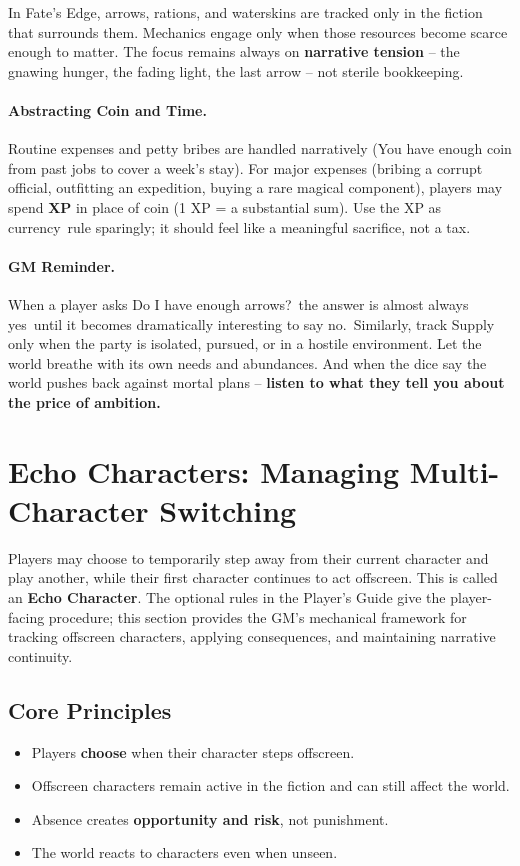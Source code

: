 In Fate's Edge, arrows, rations, and waterskins are tracked only in the fiction that surrounds them. Mechanics engage only when those resources become scarce enough to matter. The focus remains always on \textbf{narrative tension} -- the gnawing hunger, the fading light, the last arrow -- not sterile bookkeeping.

\paragraph{Abstracting Coin and Time.}
Routine expenses and petty bribes are handled narratively (\textquotedbl You have enough coin from past jobs to cover a week's stay\textquotedbl). For major expenses (bribing a corrupt official, outfitting an expedition, buying a rare magical component), players may spend \textbf{XP} in place of coin (1 XP = a substantial sum). Use the \textquotedbl XP as currency\textquotedbl\ rule sparingly; it should feel like a meaningful sacrifice, not a tax.

\paragraph{GM Reminder.}
When a player asks \textquotedbl Do I have enough arrows?\textquotedbl\ the answer is almost always \textquotedbl yes\textquotedbl\ until it becomes dramatically interesting to say \textquotedbl no.\textquotedbl\ Similarly, track Supply only when the party is isolated, pursued, or in a hostile environment. Let the world breathe with its own needs and abundances. And when the dice say the world pushes back against mortal plans -- \textbf{listen to what they tell you about the price of ambition.}

\section{Echo Characters: Managing Multi-Character Switching}
\label{sec:echo-characters-gm}

Players may choose to temporarily step away from their current character and play another, while their first character continues to act offscreen. This is called an \textbf{Echo Character}. The optional rules in the Player's Guide give the player-facing procedure; this section provides the GM's mechanical framework for tracking offscreen characters, applying consequences, and maintaining narrative continuity.

\subsection{Core Principles}
\begin{itemize}
  \item Players \textbf{choose} when their character steps offscreen.
  \item Offscreen characters remain active in the fiction and can still affect the world.
  \item Absence creates \textbf{opportunity and risk}, not punishment.
  \item The world reacts to characters even when unseen.
\end{itemize}

